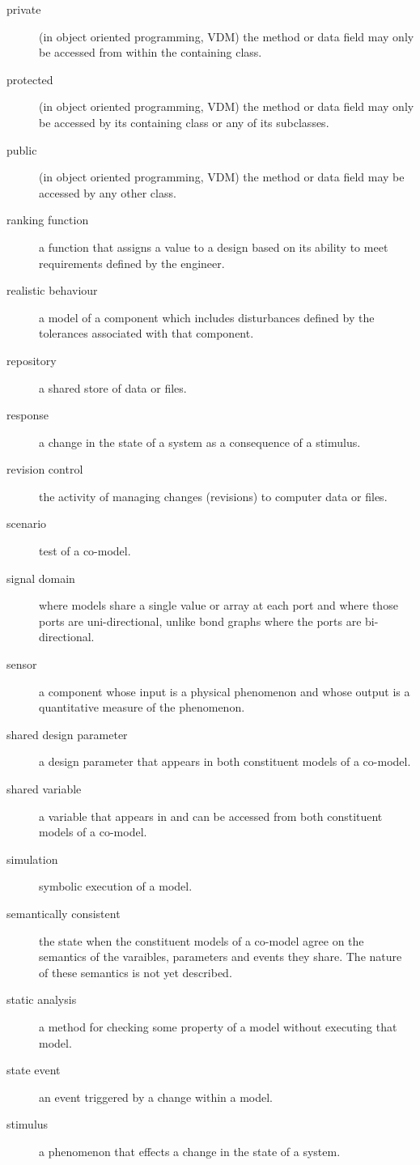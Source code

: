 \documentclass{crescendorepchap}
\begin{document}
\begin{description}
\item[private] (in object oriented programming, VDM) the method or data field may only be accessed from within the containing class.
\item[protected](in object oriented programming, VDM) the method or data field may only be accessed by its containing class or any of its subclasses.
\item[public] (in object oriented programming, VDM) the method or data field may be accessed by any other class.
\item[ranking function] a function that assigns a value to a design based on its ability to meet requirements defined by the engineer.
\item[realistic behaviour] a model of a component which includes disturbances defined by the tolerances associated with that component.
\item[repository] a shared store of data or files.
\item[response] a change in the state of a system as a consequence of a stimulus.
\item[revision control] the activity of managing changes (revisions) to computer data or files.
\item[scenario] test of a co-model.
\item[signal domain] where models share a single value or array at each port and where those ports are uni-directional, unlike bond graphs where the ports are bi-directional.
\item[sensor] a component whose input is a physical phenomenon and whose output is a quantitative measure of the phenomenon.
\item[shared design parameter] a design parameter that appears in both constituent models of a co-model.
\item[shared variable] a variable that appears in and can be accessed from both constituent models of a co-model.
\item[simulation] symbolic execution of a model.
\item[semantically consistent] the state when the constituent models of a co-model agree on the semantics of the varaibles, parameters and events they share.  The nature of these semantics is not yet described.
\item[static analysis] a method for checking some property of a model without executing that model.
\item[state event] an event triggered by a change within a model.
\item[stimulus] a phenomenon that effects a change in the state of a system.

\end{description}
\end{document}
